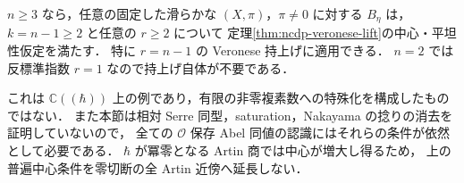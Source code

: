 \begin{corollary}
\label{cor:formal-generic-veronese}
$n\ge3$ なら，任意の固定した滑らかな $(X,\pi)$，$\pi\ne0$ に対する $B_\eta$ は，
$k=n-1\ge2$ と任意の $r\ge2$ について
定理\ref{thm:ncdp-veronese-lift}の中心・平坦性仮定を満たす．
特に $r=n-1$ の Veronese 持上げに適用できる．
$n=2$ では反標準指数 $r=1$ なので持上げ自体が不要である．
\end{corollary}

これは $\mathbb C((\hbar))$ 上の例であり，有限の非零複素数への特殊化を構成したものではない．
また本節は相対 Serre 同型，saturation，Nakayama の捻りの消去を証明していないので，
全ての $\mathcal O$ 保存 Abel 同値の認識にはそれらの条件が依然として必要である．
$\hbar$ が冪零となる Artin 商では中心が増大し得るため，
上の普遍中心条件を零切断の全 Artin 近傍へ延長しない．
